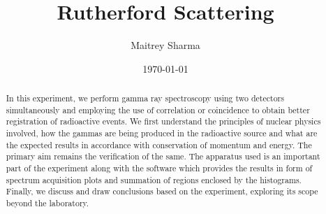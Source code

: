 \documentclass[%
 reprint,
nofootinbib,
 amsmath,amssymb,
 aps,
floatfix,
]{revtex4-2}
\begin{document}

\title{Rutherford Scattering}%


\author{Maitrey Sharma}




\date{\today}%

\begin{abstract}
    In this experiment, we perform gamma ray spectroscopy using two detectors simultaneously and employing the use of correlation or coincidence to obtain better registration of radioactive events. We first understand the principles of nuclear physics involved, how the gammas are being produced in the radioactive source and what are the expected results in accordance with conservation of momentum and energy. The primary aim remains the verification of the same. The apparatus used is an important part of the experiment along with the software which provides the results in form of spectrum acquisition plots and summation of regions enclosed by the histograms. Finally, we discuss and draw conclusions based on the experiment, exploring its scope beyond the laboratory.
\end{abstract}

\keywords{}
\maketitle

\end{document}
